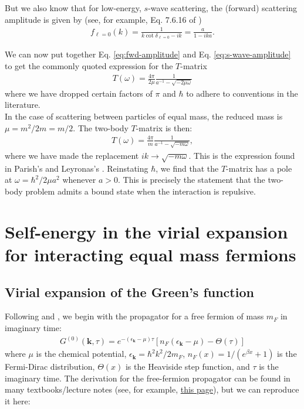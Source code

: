 \documentclass{article}
\theoremstyle{definition}
\begin{document}
\noindent But we also know that for low-energy, $s$-wave scattering, the (forward) scattering amplitude is given by (see, for example, Eq. 7.6.16 of \cite{sakurai1995modern})
\begin{align}\label{eq:s-wave-amplitude}
f_{\ell = 0}(k) = \frac{1}{k\cot \delta_{\ell = 0} - ik}  = \frac{a}{1 - ika}.
\end{align}

\noindent We can now put together Eq. \eqref{eq:fwd-amplitude} and Eq. \eqref{eq:s-wave-amplitude} to get the commonly quoted expression for the $T$-matrix
\begin{align}\label{eq:T-matrix}
\boxed{T(\omega) =  \frac{4\pi}{2\mu} \frac{1}{a^{-1} - \sqrt{- 2\mu\omega}}}
\end{align}
where we have dropped certain factors of $\pi$ and $\hbar$ to adhere to conventions in the literature.\\

\noindent In the case of scattering between particles of equal mass, the reduced mass is $\mu = m^2/2m = m/2$. The two-body $T$-matrix is then:
\begin{align}
T(\omega) =  \frac{4\pi}{m} \frac{1}{a^{-1} - \sqrt{- m\omega}},
\end{align}
where we have made the replacement $ik \to \sqrt{-m\omega}$. This is the expression found in Parish's \cite{mulkerin2024rabi} and Leyronas's \cite{sun2015high}. Reinstating $\hbar$, we find that the $T$-matrix has a pole at $\omega = \hbar^2/2\mu a^2$ whenever $a > 0$. This is precisely the statement that the two-body problem admits a bound state when the interaction is repulsive. 



\section{Self-energy in the virial expansion for interacting equal mass fermions}

\subsection{Virial expansion of the Green's function}

Following \cite{sun2015high} and \cite{leyronas2011virial}, we begin with the propagator for a free fermion of mass $m_F$ in imaginary time:
\begin{align}\label{eq:free-fermion}
G^{(0)}(\mathbf{k}, \tau) = e^{-(\epsilon_\mathbf{k} - \mu)\tau} [ n_F(\epsilon_\mathbf{k} - \mu) - \Theta(\tau)]
\end{align}
where $\mu$ is the chemical potential, $\epsilon_\mathbf{k} = \hbar^2 k^2 / 2m_F$, $n_F(x) = 1/(e^{\beta x} + 1)$ is the Fermi-Dirac distribution, $\Theta(x)$ is the Heaviside step function, and $\tau$ is the imaginary time. The derivation for the free-fermion propagator can be found in many textbooks/lecture notes (see, for example, \href{https://webspace.science.uu.nl/~morai101/oldWebsite/public_html/SFT06four.pdf}{this page}), but we can reproduce it here:\\
\end{document}
